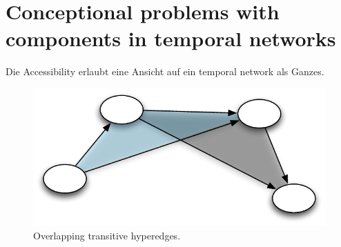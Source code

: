\section{Conceptional problems with components in temporal networks}
Die Accessibility erlaubt eine Ansicht auf ein temporal network als Ganzes.


\begin{figure}[htbp]
\begin{center}
\includegraphics{images/transitivity_scheme}
\caption{Overlapping transitive hyperedges.}
\label{fig:overlapping_hyperedges}
\end{center}
\end{figure}

